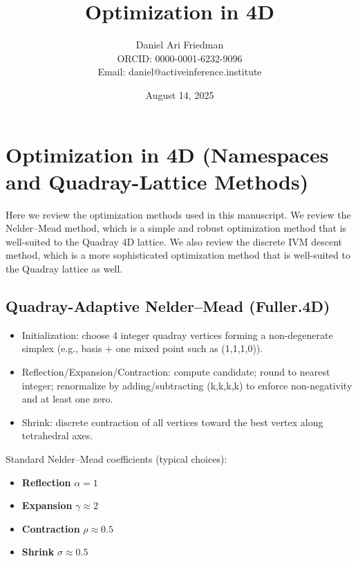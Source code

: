 \documentclass[
]{article}
\title{Optimization in 4D}
\author{Daniel Ari Friedman\\ ORCID: 0000-0001-6232-9096\\ Email: daniel@activeinference.institute}
\date{August 14, 2025}
\providecommand{\tightlist}{%
  \setlength{\itemsep}{0pt}\setlength{\parskip}{0pt}}
\begin{document}
\maketitle

\hypertarget{optimization-in-4d-namespaces-and-quadray-lattice-methods}{%
\section{Optimization in 4D (Namespaces and Quadray-Lattice
Methods)}\label{optimization-in-4d-namespaces-and-quadray-lattice-methods}}

Here we review the optimization methods used in this manuscript. We
review the Nelder--Mead method, which is a simple and robust
optimization method that is well-suited to the Quadray 4D lattice. We
also review the discrete IVM descent method, which is a more
sophisticated optimization method that is well-suited to the Quadray
lattice as well.

\hypertarget{quadray-adaptive-neldermead-fuller.4d}{%
\subsection{Quadray-Adaptive Nelder--Mead
(Fuller.4D)}\label{quadray-adaptive-neldermead-fuller.4d}}

\begin{itemize}
\tightlist
\item
  Initialization: choose 4 integer quadray vertices forming a
  non-degenerate simplex (e.g., basis + one mixed point such as
  (1,1,1,0)).
\item
  Reflection/Expansion/Contraction: compute candidate; round to nearest
  integer; renormalize by adding/subtracting (k,k,k,k) to enforce
  non-negativity and at least one zero.
\item
  Shrink: discrete contraction of all vertices toward the best vertex
  along tetrahedral axes.
\end{itemize}

Standard Nelder--Mead coefficients (typical choices):

\begin{itemize}
\tightlist
\item
  \textbf{Reflection} \(\alpha = 1\)
\item
  \textbf{Expansion} \(\gamma \approx 2\)
\item
  \textbf{Contraction} \(\rho \approx 0.5\)
\item
  \textbf{Shrink} \(\sigma \approx 0.5\)
\end{itemize}
\end{document}
